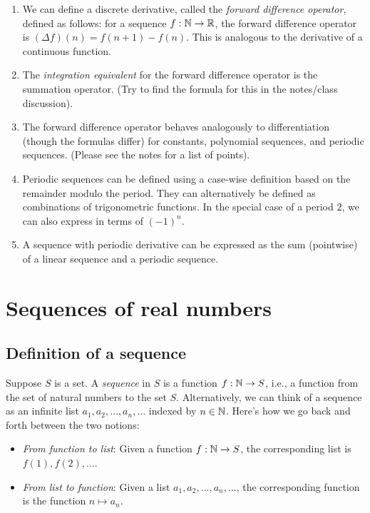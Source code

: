 \documentclass{amsart}
\begin{document}
\begin{enumerate}
\item We can define a discrete derivative, called the {\em forward
  difference operator}, defined as follows: for a sequence $f:\mathbb{N} \to
  \mathbb{R}$, the forward difference operator is $(\Delta f)(n) = f(n + 1) -
  f(n)$. This is analogous to the derivative of a continuous function.
\item The {\em integration equivalent} for the forward difference
  operator is the summation operator. (Try to find the formula for
  this in the notes/class discussion).
\item The forward difference operator behaves analogously to
  differentiation (though the formulas differ) for constants,
  polynomial sequences, and periodic sequences. (Please see the notes
  for a list of points).
\item Periodic sequences can be defined using a case-wise definition
  based on the remainder modulo the period. They can alternatively be
  defined as combinations of trigonometric functions. In the special
  case of a period $2$, we can also express in terms of $(-1)^n$.
\item A sequence with periodic derivative can be expressed as the sum
  (pointwise) of a linear sequence and a periodic sequence.
\end{enumerate}

\section{Sequences of real numbers}

\subsection{Definition of a sequence}

Suppose $S$ is a set. A {\em sequence} in $S$ is a function $f: \mathbb{N} \to
S$, i.e., a function from the set of natural numbers to the set
$S$. Alternatively, we can think of a sequence as an infinite list
$a_1, a_2, \dots, a_n, \dots$ indexed by $n \in \mathbb{N}$. Here's how we go
back and forth between the two notions:

\begin{itemize}
\item {\em From function to list}: Given a function $f: \mathbb{N} \to S$, the
  corresponding list is $f(1), f(2), \dots$.
\item {\em From list to function}: Given a list $a_1, a_2, \dots, a_n,
  \dots$, the corresponding function is the function $n \mapsto a_n$.
\end{itemize}
\end{document}
